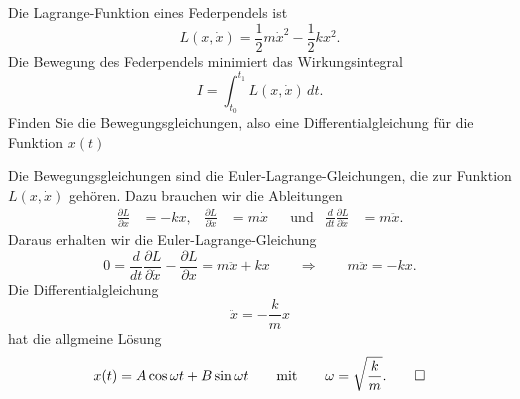 Die Lagrange-Funktion eines Federpendels ist
\[
L(x,\dot x) = \frac12m\dot x^2 - \frac12kx^2.
\]
Die Bewegung des Federpendels minimiert das Wirkungsintegral
\[
I
=
\int_{t_0}^{t_1} L(x,\dot x)\,dt.
\]
Finden Sie die Bewegungsgleichungen, also eine Differentialgleichung
für die Funktion $x(t)$

\begin{loesung}
Die Bewegungsgleichungen sind die Euler-Lagrange-Gleichungen, die zur
Funktion $L(x,\dot x)$ gehören.
Dazu brauchen wir die Ableitungen
\[
\begin{aligned}
\frac{\partial L}{\partial x}
&=
-kx,
&
\frac{\partial L}{\partial \dot x}
&=
m\dot x
&&\text{und}&
\frac{d}{dt}\frac{\partial L}{\partial\dot x}
&=
m\ddot x.
\end{aligned}
\]
Daraus erhalten wir die Euler-Lagrange-Gleichung
\[
0
=
\frac{d}{dt}\frac{\partial L}{\partial\dot x}
-\frac{\partial L}{\partial x}
=
m\ddot x+kx
\qquad\Rightarrow\qquad
m\ddot x=-kx.
\]
Die Differentialgleichung
\[
\ddot x = -\frac{k}{m}x
\]
hat die allgmeine Lösung
\[
x(t)=A\cos\omega t + B\sin\omega t
\qquad\text{mit}\qquad
\omega=\sqrt{\frac{k}{m}}.
\qedhere
\]
\end{loesung}

